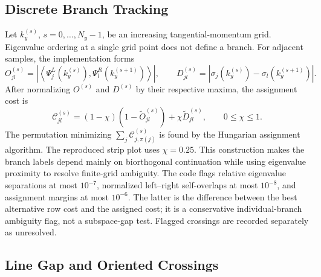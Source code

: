 \documentclass[11pt]{article}
\numberwithin{equation}{section}
\begin{document}
\subsection{Discrete Branch Tracking}

Let $k_y^{(s)}$, $s=0,\ldots,N_y-1$, be an increasing tangential-momentum
grid.  Eigenvalue ordering at a single grid point does not define a branch.
For adjacent samples, the implementation forms
\begin{equation}
  O_{jl}^{(s)}=
  \left|\left\langle
  \Psi_j^L(k_y^{(s)}),\Psi_l^R(k_y^{(s+1)})
  \right\rangle\right|,
  \qquad
  D_{jl}^{(s)}=
  \left|\sigma_j(k_y^{(s)})-\sigma_l(k_y^{(s+1)})\right|.
  \label{eq:branch_overlap_distance}
\end{equation}
After normalizing $O^{(s)}$ and $D^{(s)}$ by their respective maxima, the
assignment cost is
\begin{equation}
  \mathcal C_{jl}^{(s)}=
  (1-\chi)(1-\widetilde O_{jl}^{(s)})
  +\chi\widetilde D_{jl}^{(s)},
  \qquad 0\leq\chi\leq1.
  \label{eq:branch_assignment_cost}
\end{equation}
The permutation minimizing $\sum_j\mathcal C_{j,\pi(j)}^{(s)}$ is found by
the Hungarian assignment algorithm.  The reproduced strip plot uses
$\chi=0.25$.  This construction makes the branch labels depend mainly on
biorthogonal continuation while using eigenvalue proximity to resolve
finite-grid ambiguity. The code flags relative eigenvalue separations
at most $10^{-7}$, normalized left--right self-overlaps at most $10^{-8}$,
and assignment margins at most $10^{-6}$. The latter is the difference
between the best alternative row cost and the assigned cost; it is a
conservative individual-branch ambiguity flag, not a subspace-gap test.
Flagged crossings are recorded separately as unresolved.

\subsection{Line Gap and Oriented Crossings}
\end{document}
